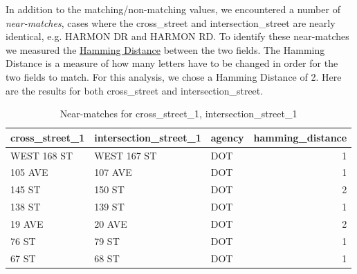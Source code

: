 \documentclass[12pt, titlepage]{article}
\begin{document}
In addition to the matching/non-matching values, we encountered a number 
of \emph{near-matches}, cases where the 
cross\_street and intersection\_street are nearly identical, 
e.g. HARMON DR and HARMON RD. To identify these 
near-matches we measured the \href{https://en.wikipedia.org/wiki/Hamming_distance}
{Hamming Distance} between the two fields. The Hamming Distance is a 
measure of how many letters have to be changed in order for the two 
fields to match. For this analysis, we chose a Hamming Distance of 2. Here 
are the results for both cross\_street and intersection\_street.

\begin{table}[tbp]
    \centering
     \caption{Near-matches for cross\_street\_1, intersection\_street\_1}
     \label{tab:x1nearmatches}
		\begin{tabular}{l l l r}
	        \toprule
	        \textbf{cross\_street\_1} & \textbf{intersection\_street\_1} 
	        & \textbf{agency} & \textbf{hamming\_distance} \\
	        \midrule
	        WEST 168 ST    & WEST 167 ST           & DOT    & 1 \\
	        105 AVE        & 107 AVE               & DOT    & 1 \\
	        145 ST         & 150 ST                & DOT    & 2 \\
	        138 ST         & 139 ST                & DOT    & 1 \\
	        19 AVE         & 20 AVE                & DOT    & 2 \\
	        76 ST          & 79 ST                 & DOT    & 1 \\
	        67 ST          & 68 ST                 & DOT    & 1 \\
	        \bottomrule
	    \end{tabular}
\end{table}
\end{document}
